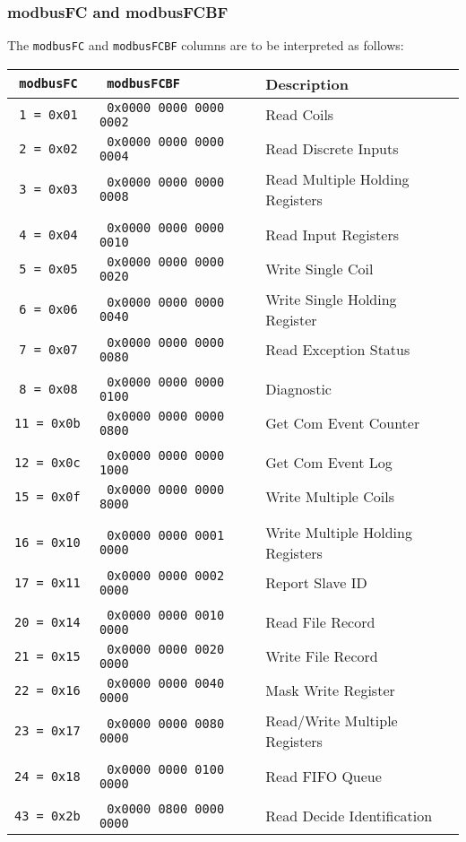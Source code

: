 \documentclass[documentation]{subfiles}
\begin{document}
\subsubsection{modbusFC and modbusFCBF}\label{modbusFC}
The {\tt modbusFC} and {\tt modbusFCBF} columns are to be interpreted as follows:
\begin{longtable}{>{\tt}r>{\tt}ll}
    \toprule
    {\bf modbusFC} & {\bf modbusFCBF} & {\bf Description}\\
    \midrule\endhead%
     1 = 0x01 & 0x0000 0000 0000 0002 & Read Coils\\
     2 = 0x02 & 0x0000 0000 0000 0004 & Read Discrete Inputs\\
     3 = 0x03 & 0x0000 0000 0000 0008 & Read Multiple Holding Registers\\
     \\
     4 = 0x04 & 0x0000 0000 0000 0010 & Read Input Registers\\
     5 = 0x05 & 0x0000 0000 0000 0020 & Write Single Coil\\
     6 = 0x06 & 0x0000 0000 0000 0040 & Write Single Holding Register\\
     7 = 0x07 & 0x0000 0000 0000 0080 & Read Exception Status\\
     \\
     8 = 0x08 & 0x0000 0000 0000 0100 & Diagnostic\\
    11 = 0x0b & 0x0000 0000 0000 0800 & Get Com Event Counter\\
    \\
    12 = 0x0c & 0x0000 0000 0000 1000 & Get Com Event Log\\
    15 = 0x0f & 0x0000 0000 0000 8000 & Write Multiple Coils\\
    \\
    16 = 0x10 & 0x0000 0000 0001 0000 & Write Multiple Holding Registers\\
    17 = 0x11 & 0x0000 0000 0002 0000 & Report Slave ID\\
    \\
    20 = 0x14 & 0x0000 0000 0010 0000 & Read File Record\\
    21 = 0x15 & 0x0000 0000 0020 0000 & Write File Record\\
    22 = 0x16 & 0x0000 0000 0040 0000 & Mask Write Register\\
    23 = 0x17 & 0x0000 0000 0080 0000 & Read/Write Multiple Registers\\
    \\
    24 = 0x18 & 0x0000 0000 0100 0000 & Read FIFO Queue\\
    \\
    43 = 0x2b & 0x0000 0800 0000 0000 & Read Decide Identification\\
    \bottomrule
\end{longtable}
\end{document}
